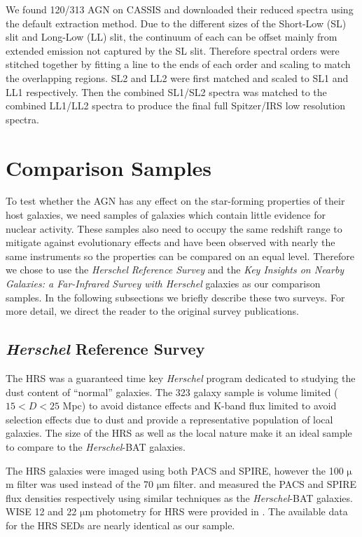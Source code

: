 \documentclass[fleqn,usenatbib]{mnras}
\newcommand{\herschel}{\emph{Herschel}}
\newcommand{\um}{$\mathrm{\mu}$m}
\begin{document}
We found 120/313 AGN on CASSIS and downloaded their reduced spectra using the default extraction method. Due to the different sizes of the Short-Low (SL) slit and Long-Low (LL) slit, the continuum of each can be offset mainly from extended emission not captured by the SL slit. Therefore spectral orders were stitched together by fitting a line to the ends of each order and scaling to match the overlapping regions. SL2 and LL2 were first matched and scaled to SL1 and LL1 respectively. Then the combined SL1/SL2 spectra was matched to the combined LL1/LL2 spectra to produce the final full Spitzer/IRS low resolution spectra. 

\section{Comparison Samples}
To test whether the AGN has any effect on the star-forming properties of their host galaxies, we need samples of galaxies which contain little evidence for nuclear activity. These samples also need to occupy the same redshift range to mitigate against evolutionary effects and have been observed with nearly the same instruments so the properties can be compared on an equal level. Therefore we chose to use the \herschel{} \textit{Reference Survey} \cite[HRS;][]{Boselli:2010fj} and the \textit{Key Insights on Nearby Galaxies: a Far-Infrared Survey with Herschel} \cite[KINGFISH;][]{Kennicutt:2011vn} galaxies as our comparison samples. In the following subsections we briefly describe these two surveys. For more detail, we direct the reader to the original survey publications.

\subsection{\herschel{} Reference Survey}
The HRS was a guaranteed time key \herschel{} program dedicated to studying the dust content of ``normal'' galaxies. The 323 galaxy sample is volume limited ($15< D < 25$ Mpc) to avoid distance effects and K-band flux limited to avoid selection effects due to dust and provide a representative population of local galaxies. The size of the HRS as well as the local nature make it an ideal sample to compare to the \herschel-BAT galaxies.

The HRS galaxies were imaged using both PACS and SPIRE, however the 100 \um{} filter was used instead of the 70 \um{} filter. \citet{Cortese:2014qq} and \citet{Ciesla:2012lq} measured the PACS and SPIRE flux densities respectively using similar techniques as the \herschel-BAT galaxies. WISE 12 and 22 \um{} photometry for HRS were provided in \citet{Ciesla:2014qy}. The available data for the HRS SEDs are nearly identical as our sample. 
\end{document}
